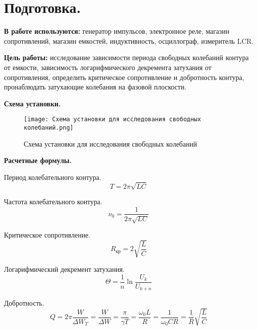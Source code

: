 
% 


	
	
	
	\section{Подготовка.}
	
	\noindent \textbf{В работе используются:} генератор импульсов, электронное реле, магазин сопротивлений, магазин емкостей, индуктивность, осциллограф, измеритель LCR.
	
	\noindent \textbf{Цель работы:} исследование зависимости периода свободных колебаний контура от емкости, зависимость логарифмического декремента затухания от сопротивления, определить критическое сопротивление и добротность контура, пронаблюдать затухающие колебания на фазовой плоскости.
	
	\hfill \break
	
	\noindent \textbf{Схема установки.}
	
	\begin{figure} [h!]
		\centering
		\texttt{[image: Схема установки для исследования свободных колебаний.png]}
		\caption{Схема установки для исследования свободных колебаний}
	\end{figure}
	
	\hfill \break
	
	\noindent \textbf{Расчетные формулы.}
	
	\noindent Период колебательного контура.
	\begin{equation}
	T = 2 \pi \sqrt{LC}
	\end{equation}
	
	\noindent Частота колебательного контура.
	\begin{equation}
	\nu_0 = \frac{1}{2 \pi \sqrt{LC}}
	\end{equation}
	
	\noindent Критическое сопротивление.
	\begin{equation}
	R_{\text{кр}} = 2 \sqrt{\frac{L}{C}}
	\end{equation}
	
	\noindent Логарифмический декремент затухания.
	\begin{equation}
	\Theta = \frac{1}{n} \ln \frac{U_k}{U_{k + n}}
	\end{equation}
	
	\noindent Добротность.
	\begin{equation}
	Q = 2 \pi \frac{W}{\Delta W_T} = \frac{W}{\Delta W} = \frac{\pi}{\gamma T} = \frac{\omega_0 L}{R} = \frac{1}{\omega_0 CR} = \frac{1}{R} \sqrt{\frac{L}{C}}
	\end{equation}
	

